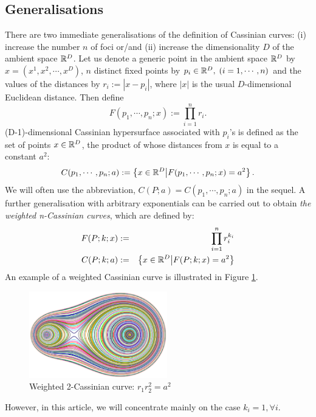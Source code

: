 \documentclass{article}
\begin{document}
\subsection{Generalisations}
\label{sec-1-2}
There are two immediate generalisations of the definition of Cassinian curves: (i) increase the number $n$ of foci or/and (ii) increase the dimensionality $D$ of the ambient space $\mathbb R^{D}$. 
Let us denote a generic point in the ambient space $\mathbb R^{D}$ by $x =(x^1, x^2, \cdots, x^D)$, $n$ distinct fixed points by $p_i \in \mathbb R^D, \; (i=1,\cdots, n)$ 
and the values of the distances by $r_i := |x-p_i|$, where $|x|$ is the usual $D$-dimensional Euclidean distance.
 Then define 
\begin{equation}
\label{}
F(p_1,\cdots,p_n;x):=\prod_{i=1}^{n} r_i.
\end{equation}
(D-1)-dimensional Cassinian hypersurface associated with $p_i$'s is defined as the set of points $x\in \mathbb R^D$, the product of whose distances from $x$ is equal to a constant $a^2$:
\begin{equation}
\label{ }
C(p_1,\cdots,p_n;a) :=\left\{ {x\in \mathbb R^D} \big| {F(p_1,\cdots,p_n;x) = a^2 } \right\}.
\end{equation}
We will often use the abbreviation, $C(P;a)=C(p_1,\cdots,p_n;a)$ in the sequel. 
A further generalisation with arbitrary exponentials can be carried out to obtain \emph{the weighted n-Cassinian curves}, which are defined by:
\begin{eqnarray}
F(P;k;x) & := & \prod_{i=1}^{n} r_i^{k_i} \nonumber\\
C(P;k;a) &:=&\left\{ {x\in \mathbb R^D} \big| {F(P;k;x) = a^2 } \right\}
\end{eqnarray}
An example of a weighted Cassinian curve is illustrated in Figure \ref{fig:weited_2_cass}.
\begin{figure}[h]
\begin{center}
\includegraphics[width=6cm]{images/cassini2_weighted.eps}
\caption{Weighted 2-Cassinian curve: $r_1 r_2^2 = a^2$}
\label{fig:weited_2_cass}
\end{center}
\end{figure}
However, in this article, we will concentrate mainly on the case $k_i = 1, \forall i$.
\end{document}

